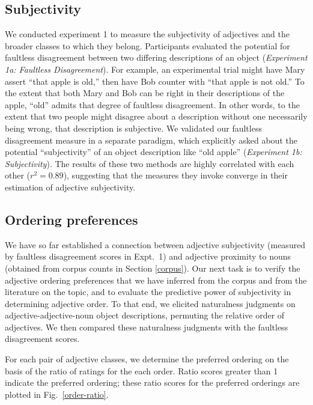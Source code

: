 \documentclass{pnastwo}
\begin{document}
\begin{article}
\subsection{Subjectivity} We conducted experiment 1 to measure the subjectivity of adjectives and the broader classes to which they belong. Participants evaluated the potential for faultless disagreement between two differing descriptions of an object (\emph{Experiment 1a: Faultless Disagreement}). For example, an experimental trial might have Mary assert ``that apple is old,'' then have Bob counter with ``that apple is not old.'' To the extent that both Mary and Bob can be right in their descriptions of the apple, ``old'' admits that degree of faultless disagreement. In other words, to the extent that two people might disagree about a description without one necessarily being wrong, that description is subjective. We validated our faultless disagreement measure in a separate paradigm, which explicitly asked about the potential ``subjectivity'' of an object description like ``old apple'' (\emph{Experiment 1b: Subjectivity}). The results of these two methods are highly correlated with each other ($r^{2} = 0.89$), suggesting that the measures they invoke converge in their estimation of adjective subjectivity. 




\subsection{Ordering preferences}
We have so far established a connection between adjective subjectivity (measured by faultless disagreement scores in Expt.\ 1) and adjective proximity to nouns (obtained from corpus counts in Section \ref{corpus}). Our next task is to verify the adjective ordering preferences that we have inferred from the corpus and from the literature on the topic, and to evaluate the predictive power of subjectivity in determining adjective order. To that end, we elicited naturalness judgments on adjective-adjective-noun object descriptions, permuting the relative order of adjectives. We then compared these naturalness judgments with the faultless disagreement scores.

For each pair of adjective classes, we determine the preferred ordering on the basis of the ratio of ratings for the each order. Ratio scores greater than 1 indicate the preferred ordering; these ratio scores for the preferred orderings are plotted in Fig.\ \ref{order-ratio}.


\end{article}
\end{document}
